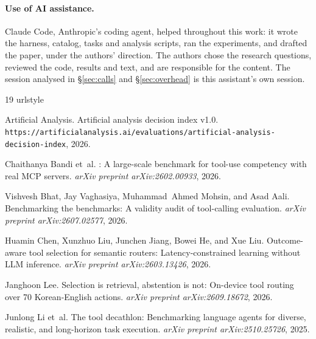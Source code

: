 \paragraph{Use of AI assistance.} Claude Code, Anthropic's coding agent, helped throughout this work: it wrote
the harness, catalog, tasks and analysis scripts, ran the experiments, and drafted the paper, under the authors'
direction. The authors chose the research questions, reviewed the code, results and text, and are responsible
for the content. The session analysed in \S\ref{sec:calls} and \S\ref{sec:overhead} is this assistant's own
session.

\begin{thebibliography}{19}
\providecommand{\natexlab}[1]{#1}
\providecommand{\url}[1]{\texttt{#1}}
\expandafter\ifx\csname urlstyle\endcsname\relax
  \providecommand{\doi}[1]{doi: #1}\else
  \providecommand{\doi}{doi: \begingroup \urlstyle{rm}\Url}\fi

{Artificial Analysis}.
\newblock Artificial analysis decision index v1.0.
\newblock
  \url{https://artificialanalysis.ai/evaluations/artificial-analysis-decision-index},
  2026.

Chaithanya Bandi et~al.
: A large-scale benchmark for tool-use competency with
  real {MCP} servers.
\newblock \emph{arXiv preprint arXiv:2602.00933}, 2026.

Vishvesh Bhat, Jay Vaghasiya, Muhammad~Ahmed Mohsin, and Asad Aali.
\newblock Benchmarking the benchmarks: A validity audit of tool-calling
  evaluation.
\newblock \emph{arXiv preprint arXiv:2607.02577}, 2026.

Huamin Chen, Xunzhuo Liu, Junchen Jiang, Bowei He, and Xue Liu.
\newblock Outcome-aware tool selection for semantic routers:
  Latency-constrained learning without {LLM} inference.
\newblock \emph{arXiv preprint arXiv:2603.13426}, 2026.

Janghoon Lee.
\newblock Selection is retrieval, abstention is not: On-device tool routing
  over 70 {Korean-English} actions.
\newblock \emph{arXiv preprint arXiv:2609.18672}, 2026.

Junlong Li et~al.
\newblock The tool decathlon: Benchmarking language agents for diverse,
  realistic, and long-horizon task execution.
\newblock \emph{arXiv preprint arXiv:2510.25726}, 2025.


\end{thebibliography}
